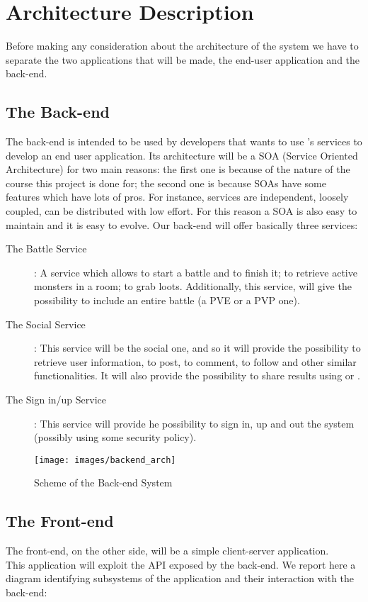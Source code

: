 \chapter{Architecture Description}
	Before making any consideration about the architecture of the system we have to separate the two applications that will be made, the end-user application and the back-end.

	\section{The Back-end}
	The back-end is intended to be used by developers that wants to use \SocialBattle{}'s services to develop an end user application. Its architecture will be a SOA (Service Oriented Architecture) for two main reasons: the first one is because of the nature of the course this project is done for; the second one is because SOAs have some features which have lots of pros. For instance, services are independent, loosely coupled, can be distributed with low effort. For this reason a SOA is also easy to maintain and it is easy to evolve.
\newpage
	Our back-end will offer basically three services:
	\begin{description}
		\item[The Battle Service]: A service which allows to start a battle and to finish it; to retrieve active monsters in a room; to grab loots. Additionally, this service, will give the possibility to include an entire battle (a PVE or a PVP one).
		\item[The Social Service]: This service will be the social one, and so it will provide the possibility to retrieve user information, to post, to comment, to follow and other similar functionalities. It will also provide the possibility to share results using \Facebook{} or \Twitter{}.
		\item[The Sign in/up Service]: This service will provide he possibility to sign in, up and out the system (possibly using some security policy).
	\end{description}
	\begin{figure}[H]
		\centering
		\texttt{[image: images/backend\_arch]}
		\caption{Scheme of the Back-end System}
		\label{fig:backend_arch}
	\end{figure}
	\section{The Front-end}
		The front-end, on the other side, will be a simple client-server application.\\
		This application will exploit the API exposed by the back-end. We report here a diagram identifying subsystems of the application and their interaction with the back-end:

